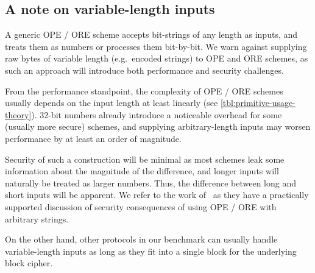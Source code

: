 	\subsection{A note on variable-length inputs}\label{sec:variable-inputs}

		A generic OPE / ORE scheme accepts bit-strings of any length as inputs, and treats them as numbers or processes them bit-by-bit.
		We warn against supplying raw bytes of variable length (e.g.\ encoded strings) to OPE and ORE schemes, as such an approach will introduce both performance and security challenges.

		From the performance standpoint, the complexity of OPE / ORE schemes usually depends on the input length at least linearly (see \cref{tbl:primitive-usage-theory}).
		32-bit numbers already introduce a noticeable overhead for some (usually more secure) schemes, and supplying arbitrary-length inputs may worsen performance by at least an order of magnitude.

		Security of such a construction will be minimal as most schemes leak some information about the magnitude of the difference, and longer inputs will naturally be treated as larger numbers.
		Thus, the difference between long and short inputs will be apparent.
		We refer to the work of~\textcite{leakage-abuse-grubs-2017} as they have a practically supported discussion of security consequences of using OPE / ORE with arbitrary strings.

		On the other hand, other protocols in our benchmark can usually handle variable-length inputs as long as they fit into a single block for the underlying block cipher.
